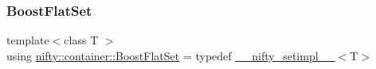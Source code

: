 \mbox{\label{namespacenifty_1_1container_ad9f6bbba60eac29f50d418e4c09d5c7b}} 
\subsubsection{\texorpdfstring{Boost\+Flat\+Set}{BoostFlatSet}}
{\footnotesize\ttfamily template$<$class T $>$ \\
using \hyperlink{namespacenifty_1_1container_ad9f6bbba60eac29f50d418e4c09d5c7b}{nifty\+::container\+::\+Boost\+Flat\+Set} = typedef \hyperlink{boost__flat__set_8hxx_a6b7afcb706c8e2ecfc2e7c25c7291148}{\+\_\+\+\_\+nifty\+\_\+setimpl\+\_\+\+\_\+}$<$T$>$}

